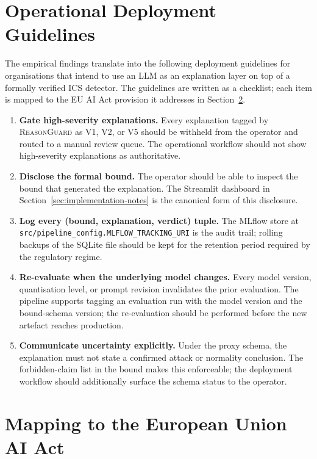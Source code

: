 \section{Operational Deployment Guidelines}
\label{sec:discussion-deployment}

The empirical findings translate into the following deployment guidelines
for organisations that intend to use an LLM as an explanation layer on top
of a formally verified ICS detector. The guidelines are written as a
checklist; each item is mapped to the EU AI Act provision it addresses in
Section~\ref{sec:discussion-eu-ai-act}.

\begin{enumerate}
  \item \textbf{Gate high-severity explanations.} Every explanation tagged
        by \textsc{ReasonGuard} as V1, V2, or V5 should be withheld from
        the operator and routed to a manual review queue. The operational
        workflow should not show high-severity explanations as
        authoritative.
  \item \textbf{Disclose the formal bound.} The operator should be able to
        inspect the bound that generated the explanation. The Streamlit
        dashboard in Section~\ref{sec:implementation-notes} is the
        canonical form of this disclosure.
  \item \textbf{Log every (bound, explanation, verdict) tuple.} The MLflow
        store at \texttt{src/pipeline\_config.MLFLOW\_TRACKING\_URI} is the
        audit trail; rolling backups of the SQLite file should be kept for
        the retention period required by the regulatory regime.
  \item \textbf{Re-evaluate when the underlying model changes.} Every
        model version, quantisation level, or prompt revision invalidates
        the prior evaluation. The pipeline supports tagging an evaluation
        run with the model version and the bound-schema version; the
        re-evaluation should be performed before the new artefact reaches
        production.
  \item \textbf{Communicate uncertainty explicitly.} Under the proxy
        schema, the explanation must not state a confirmed attack or
        normality conclusion. The forbidden-claim list in the bound makes
        this enforceable; the deployment workflow should additionally
        surface the schema status to the operator.
\end{enumerate}

\section{Mapping to the European Union AI Act}
\label{sec:discussion-eu-ai-act}

